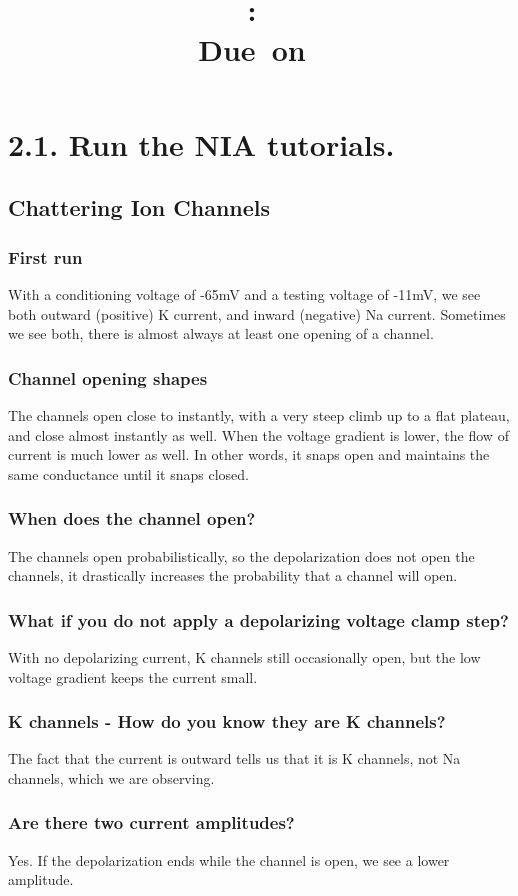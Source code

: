 \documentclass[11pt]{modart}
\title{\large{\hmwkAuthorName}\vspace{0.1in}\\\textmd{\textbf{\hmwkClass:\ \hmwkTitle}}\\\normalsize\vspace{0.1in}\small{Due\ on\ \hmwkDueDate}\\\vspace{0.1in}\large{\textit{\hmwkClassInstructor}}\vspace{0.5in}}
\author{}
\date{}
\begin{document}
\maketitle

\section{2.1. Run the NIA tutorials.}
\subsection{Chattering Ion Channels}
\subsubsection{First run}
With a conditioning voltage of -65mV and a testing voltage of -11mV,
we see both outward (positive) K current, and inward (negative) Na current.  
Sometimes we see both, there is almost always at least one opening of a channel.
\subsubsection{Channel opening shapes}
The channels open close to instantly, with a very steep climb up to a flat plateau, and close almost instantly as well.
When the voltage gradient is lower, the flow of current is much lower as well.
In other words, it snaps open and maintains the same conductance until it snaps closed.
\subsubsection{When does the channel open?}
The channels open probabilistically, so the depolarization does not open the channels,
it drastically increases the probability that a channel will open.
\subsubsection{What if you do not apply a depolarizing voltage clamp step?}
With no depolarizing current, K channels still occasionally open, but the low voltage gradient keeps the current small.
\subsubsection{K channels - How do you know they are K channels?}
The fact that the current is outward tells us that it is K channels, not Na channels, which we are observing.
\subsubsection{Are there two current amplitudes?}
Yes.  If the depolarization ends while the channel is open, we see a lower amplitude.
\end{document}
